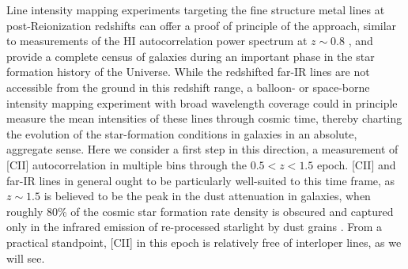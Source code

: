 \documentclass[iop,twocolappendix]{emulateapj}
\begin{document}

Line intensity mapping experiments targeting the fine structure metal lines at post-Reionization redshifts can offer a proof of principle of the approach, similar to measurements of the HI autocorrelation power spectrum at $z\sim0.8$ \citep{chang10, switzer13}, and provide a complete census of galaxies during an important phase in the star formation history of the Universe. While the redshifted far-IR lines are not accessible from the ground in this redshift range, a balloon- or space-borne intensity mapping experiment with broad wavelength coverage could in principle measure the mean intensities of these lines through cosmic time, thereby charting the evolution of the star-formation conditions in galaxies in an absolute, aggregate sense.   Here we consider a first step in this direction, a measurement of [CII] autocorrelation in multiple bins through the $0.5 < z < 1.5$ epoch.   [CII] and far-IR lines in general ought to be particularly well-suited to this time frame, as $z\sim1.5$ is believed to be the peak in the dust attenuation in galaxies, when roughly 80\% of the cosmic star formation rate density is obscured and captured only in the infrared emission of re-processed starlight by dust grains \citep{burgarella13}.   From a practical standpoint, [CII] in this epoch is relatively free of interloper lines, as we will see.
\end{document}

